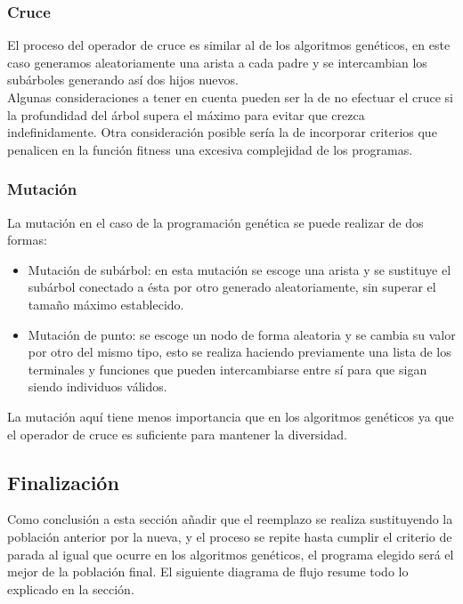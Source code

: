 \documentclass[12pt]{article} \usepackage[utf8x]{inputenc}
\begin{document}
\subsubsection{Cruce}

El proceso del operador de cruce es similar al de los algoritmos genéticos, 
en este caso generamos aleatoriamente una arista a cada padre y se 
intercambian los subárboles generando así dos hijos nuevos.\\

Algunas consideraciones a tener en cuenta pueden ser la de no efectuar
el cruce si la profundidad del árbol supera el máximo para evitar que
crezca indefinidamente. Otra consideración posible sería la de
incorporar criterios que penalicen en la función fitness una excesiva
complejidad de los programas.

\subsubsection{Mutación}

La mutación en el caso de la programación genética se puede realizar
de dos formas:

\begin{itemize}
\item Mutación de subárbol: en esta mutación se escoge una arista y se
  sustituye el subárbol conectado a ésta por otro generado
  aleatoriamente, sin superar el tamaño máximo establecido.
\item Mutación de punto: se escoge un nodo de forma aleatoria y se
  cambia su valor por otro del mismo tipo, esto se realiza haciendo
  previamente una lista de los terminales y funciones que pueden
  intercambiarse entre sí para que sigan siendo individuos válidos.
\end{itemize}

La mutación aquí tiene menos importancia que en los algoritmos
genéticos ya que el operador de cruce es suficiente para mantener la
diversidad.

\subsection{Finalización}

Como conclusión a esta sección añadir que el reemplazo se realiza
sustituyendo la población anterior por la nueva, y el proceso se
repite hasta cumplir el criterio de parada al igual que ocurre en los
algoritmos genéticos, el programa elegido será el mejor de la
población final. El siguiente diagrama de flujo resume todo lo
explicado en la sección.
\end{document}
